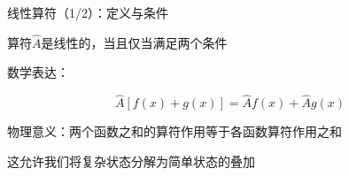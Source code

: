 \documentclass[aspectratio=169, 10pt]{beamer}
\begin{document}
\begin{frame}{算符的线性：为什么如此重要？}
\begin{iqbitemize}
      \item \textbf{齐次性验证}
      \begin{align*}
        \nabla^2(cf) &= \dfrac{\partial^2(cf)}{\partial x^2} + \cdots \\
                 &= c\dfrac{\partial^2 f}{\partial x^2} + \cdots \\
                 &= c\nabla^2 f
      \end{align*}

      \item \textbf{非线性的反例}
      \[
        \sqrt{\hat{\ }}f(x) = \sqrt{f(x)}
      \]
      显然$\sqrt{f+g} \neq \sqrt{f} + \sqrt{g}$，不满足线性
    \end{iqbitemize}
  }
\end{frame}

\begin{frame}{线性算符（1/2）：定义与条件}

  
  \begin{iqbitemize}
    \item 算符$\hat{A}$是线性的，当且仅当满足两个条件
    \end{iqbitemize}

    \begin{iqbitemize}
    \item 数学表达：
    \end{iqbitemize}
      \[
        \hat{A}[f(x) + g(x)] = \hat{A}f(x) + \hat{A}g(x)
      \]
    \begin{iqbitemize}
    \item 物理意义：两个函数之和的算符作用等于各函数算符作用之和
    \item 这允许我们将复杂状态分解为简单状态的叠加
    \end{iqbitemize}

\end{frame}
\end{document}
